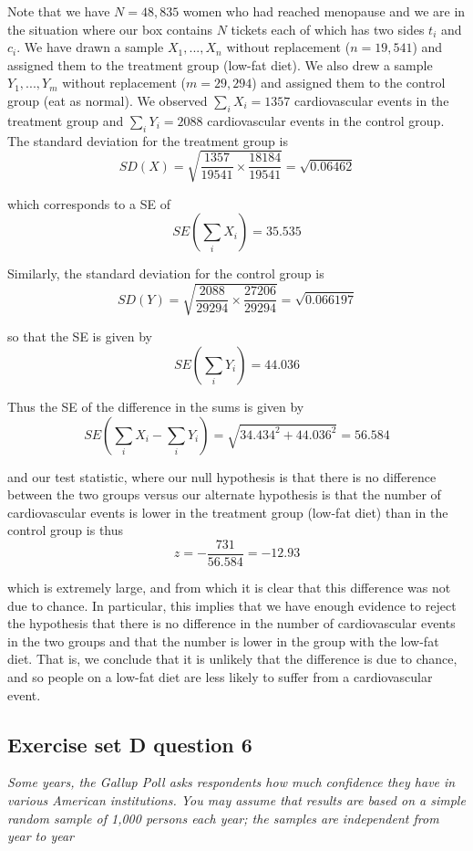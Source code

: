 \documentclass[11pt]{article}
\begin{document}
\noindent Note that we have $N = 48,835$ women who had reached menopause and we are in the situation where our box contains $N$ tickets each of which has two sides $t_i$ and $c_i$. We have drawn a sample $X_1, ..., X_n$ without replacement ($n = 19,541$) and assigned them to the treatment group (low-fat diet). We also drew a sample $Y_1, ..., Y_m$ without replacement ($m = 29,294$) and assigned them to the control group (eat as normal). We observed $\sum_i X_i = 1357$ cardiovascular events in the treatment group and $\sum_i Y_i = 2088$ cardiovascular events in the control group. The standard deviation for the treatment group is
$$SD(X) = \sqrt{\frac{1357}{19541} \times \frac{18184}{19541}} = \sqrt{0.06462}$$

\noindent which corresponds to a SE of
$$SE\left(\sum_i X_i\right) = 35.535$$

\noindent Similarly, the standard deviation for the control group is
$$SD(Y) = \sqrt{\frac{2088}{29294} \times \frac{27206}{29294}} = \sqrt{0.066197}$$

\noindent so that the SE is given by
$$SE\left(\sum_i Y_i\right) = 44.036$$

\noindent Thus the SE of the difference in the sums is given by
$$SE\left( \sum_i X_i - \sum_i Y_i\right) = \sqrt{34.434^2 + 44.036^2} = 56.584$$


\noindent and our test statistic, where our null hypothesis is that there is no difference between the two groups versus our alternate hypothesis is that the number of cardiovascular events is lower in the treatment group (low-fat diet) than in the control group is thus
$$z = -\frac{731}{56.584} = -12.93$$

\noindent which is extremely large, and from which it is clear that this difference was not due to chance. In particular, this implies that we have enough evidence to reject the hypothesis that there is no difference in the number of cardiovascular events in the two groups and that the number is lower in the group with the low-fat diet. That is, we conclude that it is unlikely that the difference is due to chance, and so people on a low-fat diet are less likely to suffer from a cardiovascular event.

\subsection*{Exercise set D question 6} %
\noindent \textit{Some years, the Gallup Poll asks respondents how much confidence they have in various American institutions. You may assume that results are based on a simple random sample of 1,000 persons each year; the samples are independent from year to year}
\end{document}
